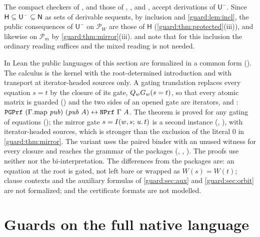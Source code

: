 \begin{remark}
\label{guard:rem:lean-public}
The compact checkers of , and those of
, ,
 and , accept derivations
of $\mathsf U^{-}$.  Since
$\mathsf H\subseteq\mathsf U^{-}\subseteq\mathsf{N}$ as sets of derivable
sequents, by inclusion and \cref{guard:lem:incl}, the public consequences
of $\mathsf U^{-}$ on $\mathcal P_W$ are those of $\mathsf H$
(\cref{guard:thm:protected}(iii)), and likewise on $\mathcal P_m$ by
\cref{guard:thm:mirror}(iii).   and 
note that for this inclusion the ordinary reading suffices and the mixed
reading is not needed.

In Lean the public languages of this section are formalized in a common
form ().  The calculus  is the kernel with
the root-determined introduction and with transport at iterator-headed
sources only.  A gating translation  replaces every equation
$s=t$ by the closure of its gate, $Q_{w}G_w(s=t)$, so that every atomic
matrix is guarded () and the two sides of an opened
gate are iterators, and
: $\Lean{PGPrf}\ (\Gamma.\mathrm{map}\ \mathit{pub})\
(\mathit{pub}\ A)\leftrightarrow\Lean{NPrf}\ \Gamma\ A$.  The theorem is
proved for any gating of equations (\Lean{Gating}); the mirror gate
$s=I(w,s;\,u.\,t)$ is a second instance (\Lean{Gating.mirror},
), with iterator-headed sources, which is stronger
than the exclusion of the literal $0$ in \cref{guard:thm:mirror}.  The
variant \Lean{NFm.pubD} uses the paired binder with an unused witness for
every closure and reaches the grammar of the packages
(, ,
).  The proofs use neither 
nor the bi-interpretation.  The differences from the packages are: an
equation at the root is gated, not left bare or wrapped as $W(s)=W(t)$;
clause contexts and the auxiliary formulas of \cref{guard:sec:aux} and
\cref{guard:sec:orbit} are not formalized; and the certificate formats are
not modelled.
\end{remark}

\section{Guards on the full native language}
\label{guard:sec:full}

